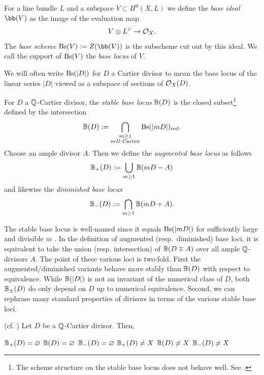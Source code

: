 \documentclass[main.tex]{subfiles}
\begin{document}
\begin{defn}
For a line bundle $L$ and a subspace $V \subset H^0(X, L)$ we define the \textit{base ideal} $\bb(V)$ as the image of the evaluation map
\[ V \otimes L^{\vee} \to \mathcal{O}_X. \]
The \textit{base scheme} $\Bs(V) := Z(\bb(V))$ is the subscheme cut out by this ideal. We call the support of $\mathrm{Bs}(V)$ the \textit{base locus} of $V$. 
\end{defn}

We will often write $\mathrm{Bs}(|D|)$ for $D$ a Cartier divisor to mean the base locus of the linear series $|D|$ viewed as a subspace of sections of $\mathcal{O}_X(D)$. 

\begin{defn}
For $D$ a $\mathbb{Q}$-Cartier divisor, the \textit{stable base locus} $\mathbb{B}(D)$ is the closed subset\footnote{The scheme structure on the stable base locus does not behave well. See \cite[Example~2.1.25]{laz:positivity_I}.} defined by the intersection
\[ \mathbb{B}(D) := \bigcap_{\substack{m \ge 1 \\ m D \text{ Cartier}}} \mathrm{Bs}(|mD|)_{\operatorname{\mathrm{red}}}. \]
Choose an ample divisor $A$. Then we define the \textit{augmented base locus} as follows
\[ \mathbb{B}_+(D) := \bigcup_{m \ge 1} \mathbb{B}(mD-A) \]
and likewise the \textit{diminished base locus}
\[ \mathbb{B}_{-}(D) := \bigcap_{m \ge 1} \mathbb{B}(mD+A). \]
\end{defn}

The stable base locus is well-named since it equals $\mathrm{Bs}(|mD|)$ for sufficiently large and divisible $m$ \cite[Proposition~2.1.21]{laz:positivity_I}. In the definition of augmented (resp.\ diminished) base loci, it is equivalent to take the union (resp. intersection) of $\mathbb{B}(D\mp A)$ over all ample $\mathbb{Q}$-divisors $A$. The point of these various loci is two-fold. First the augmented/diminished variants behave more stably than $\mathbb{B}(D)$ with respect to equivalence. While $\mathbb{B}(|D|)$ is not an invariant of the numerical class of $D$, both $\mathbb{B}_{\pm}(D)$ do only depend on $D$ up to numerical equivalence. Second, we can rephrase many standard properties of divisors in terms of the various stable base loci. 

\begin{prop} \cite[Example~1.7 and Example~1.18]{ELMNP06} (cf. \cite[\S2.3]{laz:positivity_I})
Let $D$ be a $\mathbb{Q}$-Cartier divisor. Then,
\begin{mathenum}
             {\iff}
             {$\mathbb{B}_{+}(D) = \varnothing$}
             {}
             {\iff}
             {$\mathbb{B}(D) = \varnothing$}
             {}
             {\iff}
             {$\mathbb{B}_{-}(D) = \varnothing$}
             {}
             {\iff}
             {$\mathbb{B}_{+}(D) \neq X$}
             {}          
             {\iff}
             {$\mathbb{B}(D) \neq X$}
             {}
             {\iff}
             {$\mathbb{B}_{-}(D) \neq X$}
             {}  
\end{mathenum}
\end{prop}
\end{document}
